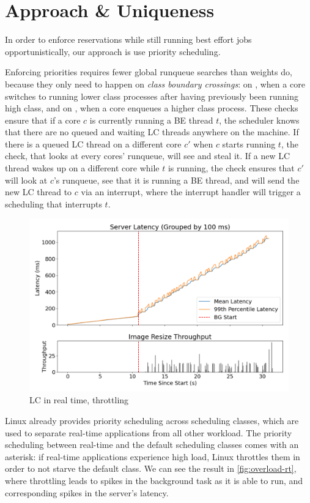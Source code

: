 \section{Approach \& Uniqueness}

In order to enforce reservations while still running best effort jobs
opportunistically, our approach is use priority scheduling.

Enforcing priorities requires fewer global runqueue searches than weights do,
because they only need to happen on \textit{class boundary crossings}: on
\exit{}, when a core switches to running lower class processes after having
previously been running high class, and on \entry{}, when a core enqueues a
higher class process. These checks ensure that if a core $c$ is currently
running a BE thread $t$, the scheduler knows that there are no queued and
waiting LC threads anywhere on the machine. If there is a queued LC thread on a
different core $c'$ when $c$ starts running $t$, the \exit{} check, that looks
at every cores' runqueue, will see and steal it. If a new LC thread wakes up on
a different core while $t$ is running, the \entry{} check ensures that $c'$ will
look at $c$'s runqueue, see that it is running a BE thread, and will send the
new LC thread to $c$ via an interrupt, where the interrupt handler will trigger
a scheduling that interrupts $t$.

\begin{figure}[t]
    \centering
    \includegraphics[width=\columnwidth]{graphs/overload-rt.png}
    \caption{LC in real time, throttling}\label{fig:overload-rt}
\end{figure}


Linux already provides priority scheduling across scheduling classes, which are
used to separate real-time applications from all other workload. The priority
scheduling between real-time and the default scheduling classes comes with an
asterisk: if real-time applications experience high load, Linux throttles them
in order to not starve the default class. We can see the result in
\autoref{fig:overload-rt}, where throttling leads to spikes in the background
task as it is able to run, and corresponding spikes in the server's latency.

